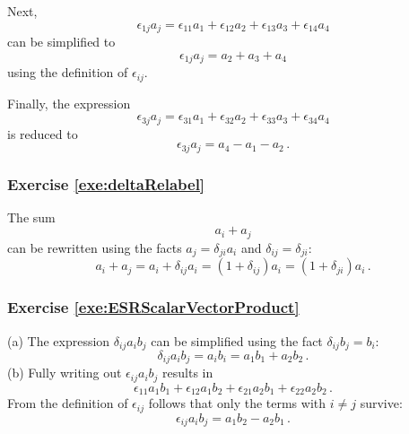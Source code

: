 Next,
\[
\epsilon_{1j}a_j = \epsilon_{11}a_1 + \epsilon_{12}a_2 +
\epsilon_{13}a_3 + \epsilon_{14}a_4
\]
can be simplified to
\[
\epsilon_{1j}a_j = a_2 + a_3 + a_4
\]
using the definition of $\epsilon_{ij}$.

Finally, the expression
\[
\epsilon_{3j}a_j = \epsilon_{31}a_1 + \epsilon_{32}a_2 +
\epsilon_{33}a_3 + \epsilon_{34}a_4
\]
is reduced to
\[
\epsilon_{3j}a_j = a_4 - a_1 - a_2\,.
\]

\subsubsection*{Exercise \ref{exe:deltaRelabel}}
The sum
\[
a_i + a_j
\]
can be rewritten using the facts $a_j=\delta_{ji}a_i$ and $\delta_{ij}=\delta_{ji}$:
\[
a_i + a_j = a_i + \delta_{ij}a_i = (1+\delta_{ij})a_i = (1+\delta_{ji})a_i\,.
\]

\subsubsection*{Exercise \ref{exe:ESRScalarVectorProduct}}
(a) The expression $\delta_{ij}a_ib_j$ can be simplified using the
fact $\delta_{ij}b_j=b_i$:
\[
\delta_{ij}a_ib_j = a_ib_i = a_1b_1 + a_2b_2\,.
\]
(b) Fully writing out $\epsilon_{ij}a_ib_j$ results in
\[
\epsilon_{11}a_1b_1 + \epsilon_{12}a_1b_2 + \epsilon_{21}a_2b_1 + \epsilon_{22}a_2b_2\,.
\]
From the definition of $\epsilon_{ij}$ follows that only the terms
with $i\ne j$ survive:
\[
\epsilon_{ij}a_ib_j = a_1b_2 - a_2b_1\,.
\]


